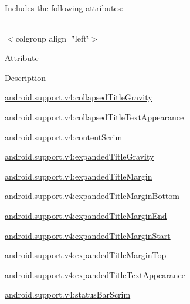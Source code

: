 Includes the following attributes\+:

\tabulinesep=1mm
\begin{longtabu} spread 0pt [c]{*{0}{|X[-1]}|}
\hline
\end{longtabu}
$<$colgroup align=\char`\"{}left\char`\"{}$>$ 

Attribute

Description 

{\ttfamily \hyperlink{classandroid_1_1support_1_1v4_1_1R_1_1styleable_a116fc8e3a3a97d7ee07ca793adfc6443}{android.\+support.\+v4\+:collapsed\+Title\+Gravity}}

{\ttfamily \hyperlink{classandroid_1_1support_1_1v4_1_1R_1_1styleable_a297bf6b40c1f2eee45e130be12d85e50}{android.\+support.\+v4\+:collapsed\+Title\+Text\+Appearance}}

{\ttfamily \hyperlink{classandroid_1_1support_1_1v4_1_1R_1_1styleable_aee1e1a60d8efff968f52ae63c1b6859c}{android.\+support.\+v4\+:content\+Scrim}}

{\ttfamily \hyperlink{classandroid_1_1support_1_1v4_1_1R_1_1styleable_aa59a6ab621e7092c65425b2e443edc19}{android.\+support.\+v4\+:expanded\+Title\+Gravity}}

{\ttfamily \hyperlink{classandroid_1_1support_1_1v4_1_1R_1_1styleable_a6fd0a1e2b2413e90f19c65f14b587b87}{android.\+support.\+v4\+:expanded\+Title\+Margin}}

{\ttfamily \hyperlink{classandroid_1_1support_1_1v4_1_1R_1_1styleable_af294e92101d0832bed66945ee1c5f89b}{android.\+support.\+v4\+:expanded\+Title\+Margin\+Bottom}}

{\ttfamily \hyperlink{classandroid_1_1support_1_1v4_1_1R_1_1styleable_ad97c2223a320934180256ace4b0d2a40}{android.\+support.\+v4\+:expanded\+Title\+Margin\+End}}

{\ttfamily \hyperlink{classandroid_1_1support_1_1v4_1_1R_1_1styleable_a5f942ec17cd01a93f6b3ce569421954b}{android.\+support.\+v4\+:expanded\+Title\+Margin\+Start}}

{\ttfamily \hyperlink{classandroid_1_1support_1_1v4_1_1R_1_1styleable_a9e49bb8ccfb4c8294690cba1fce71f73}{android.\+support.\+v4\+:expanded\+Title\+Margin\+Top}}

{\ttfamily \hyperlink{classandroid_1_1support_1_1v4_1_1R_1_1styleable_ad9258f77de37879142ccb6e7d0c1c841}{android.\+support.\+v4\+:expanded\+Title\+Text\+Appearance}}

{\ttfamily \hyperlink{classandroid_1_1support_1_1v4_1_1R_1_1styleable_a0d19b1379e73d24050b61fe835c56593}{android.\+support.\+v4\+:status\+Bar\+Scrim}}

